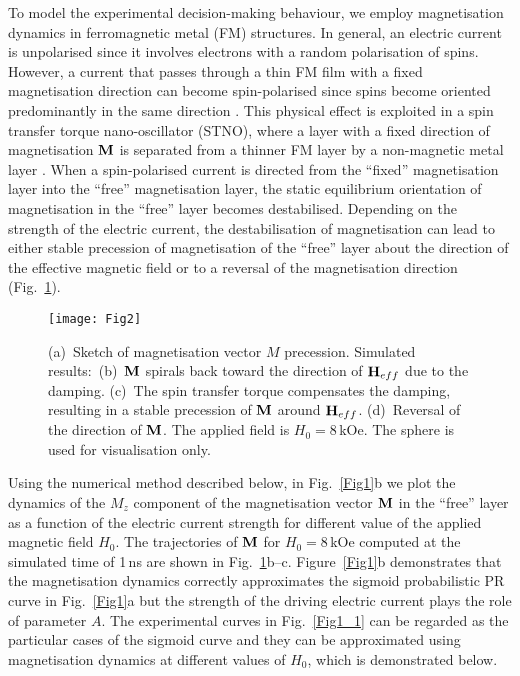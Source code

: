 \documentclass[aps,prl,reprint,superscriptaddress]{revtex4-2}
\begin{document}
To model the experimental decision-making behaviour, we employ magnetisation dynamics in ferromagnetic metal (FM) structures. In general, an electric current is unpolarised since it involves electrons with a random polarisation of spins. However, a current that passes through a thin FM film with a fixed magnetisation direction can become spin-polarised since spins become oriented predominantly in the same direction \cite{Ral08}. This physical effect is exploited in a spin transfer torque nano-oscillator (STNO), where a layer with a fixed direction of magnetisation ${\bf M}$ is separated from a thinner FM layer by a non-magnetic metal layer \cite{Rip04}. When a spin-polarised current is directed from the ``fixed'' magnetisation layer into the ``free'' magnetisation layer, the static equilibrium orientation of magnetisation in the ``free'' layer becomes destabilised. Depending on the strength of the electric current, the destabilisation of magnetisation can lead to either stable precession of magnetisation of the ``free'' layer about the direction of the effective magnetic field or to a reversal of the magnetisation direction (Fig.~\ref{Fig2}).
\begin{figure}
 \texttt{[image: Fig2]}
 \caption{(a)~Sketch of magnetisation vector $M$ precession. Simulated results:~(b)~${\bf M}$ spirals back toward the direction of ${\bf H}_{eff}$ due to the damping. (c)~The spin transfer torque compensates the damping, resulting in a stable precession of ${\bf M}$ around ${\bf H}_{eff}$. (d)~Reversal of the direction of ${\bf M}$. The applied field is $H_0=8$\,kOe. The sphere is used for visualisation only.\label{Fig2}}
\end{figure}

Using the numerical method described below, in Fig.~\ref{Fig1}b we plot the dynamics of the $M_z$ component of the magnetisation vector ${\bf M}$ in the ``free'' layer as a function of the electric current strength for different value of the applied magnetic field $H_0$. The trajectories of ${\bf M}$ for $H_0=8$\,kOe computed at the simulated time of 1\,ns are shown in Fig.~\ref{Fig2}b--c. Figure~\ref{Fig1}b demonstrates that the magnetisation dynamics correctly approximates the sigmoid probabilistic PR curve in Fig.~\ref{Fig1}a but the strength of the driving electric current plays the role of parameter $A$. The experimental curves in Fig.~\ref{Fig1_1} can be regarded as the particular cases of the sigmoid curve and they can be approximated using magnetisation dynamics at different values of $H_0$, which is demonstrated below.
\end{document}
